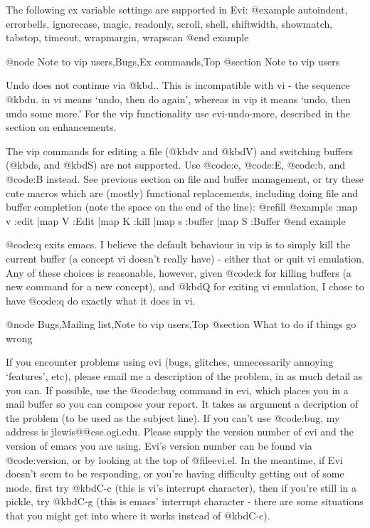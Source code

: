 {{{{{{The following ex variable settings are supported in Evi:
@example
autoindent, errorbells, ignorecase, magic, readonly, scroll, shell,
shiftwidth, showmatch, tabstop, timeout, wrapmargin, wrapscan
@end example

@node Note to vip users,Bugs,Ex commands,Top
@section Note to vip users

Undo does not continue via @kbd{.}.  This is incompatible with vi - the
sequence @kbd{u.} in vi means `undo, then do again', whereas in vip it means
`undo, then undo some more.'  For the vip functionality use
evi-undo-more, described in the section on enhancements.

The vip commands for editing a file (@kbd{v} and @kbd{V}) and switching buffers
(@kbd{s}, and @kbd{S}) are not supported.
Use @code{:e}, @code{:E}, @code{:b}, and @code{:B}
instead.  See previous section on file and buffer management, or try
these cute macros which are (mostly) functional replacements, including
doing file and buffer completion (note the space on the end of the
line): @refill
@example
:map v :edit |map V :Edit |map K :kill |map s :buffer |map S :Buffer 
@end example

@code{:q} exits emacs.  I believe the default behaviour in vip is to simply
kill the current buffer (a concept vi doesn't really have) - either that
or quit vi emulation.  Any of these choices is reasonable, however,
given @code{:k} for killing buffers (a new command for a new concept), and
@kbd{Q} for exiting vi emulation, I chose to have @code{:q} do exactly what it
does in vi.

@node Bugs,Mailing list,Note to vip users,Top
@section What to do if things go wrong

If you encounter problems using evi (bugs, glitches, unnecessarily annoying
`features', etc), please email me a description of the problem, in as much
detail as you can.  If possible, use the @code{:bug} command in evi, which
places you in a mail buffer so you can compose your report.  It takes as
argument a decription of the problem (to be used as the subject line).  If
you can't use @code{:bug}, my address is jlewis@@cse.ogi.edu.  Please supply
the version number of evi and the version of emacs you are using.  Evi's
version number can be found via @code{:version}, or by looking at the top
of @file{evi.el}.  In the meantime, if Evi doesn't seem to be responding, or
you're having difficulty getting out of some mode, first try @kbd{C-c} (this
is vi's interrupt character), then if you're still in a pickle, try @kbd{C-g}
(this is emacs' interrupt character - there are some situations that you might
get into where it works instead of @kbd{C-c}).

}}}}}}
